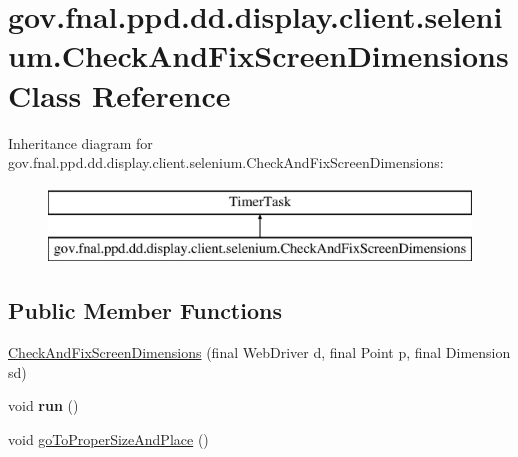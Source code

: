 \hypertarget{classgov_1_1fnal_1_1ppd_1_1dd_1_1display_1_1client_1_1selenium_1_1CheckAndFixScreenDimensions}{\section{gov.\-fnal.\-ppd.\-dd.\-display.\-client.\-selenium.\-Check\-And\-Fix\-Screen\-Dimensions Class Reference}
\label{classgov_1_1fnal_1_1ppd_1_1dd_1_1display_1_1client_1_1selenium_1_1CheckAndFixScreenDimensions}
}
Inheritance diagram for gov.\-fnal.\-ppd.\-dd.\-display.\-client.\-selenium.\-Check\-And\-Fix\-Screen\-Dimensions\-:\begin{figure}[H]
\begin{center}
\leavevmode
\includegraphics[height=2.000000cm]{classgov_1_1fnal_1_1ppd_1_1dd_1_1display_1_1client_1_1selenium_1_1CheckAndFixScreenDimensions}
\end{center}
\end{figure}
\subsection*{Public Member Functions}
\begin{DoxyCompactItemize}
\item 
\hyperlink{classgov_1_1fnal_1_1ppd_1_1dd_1_1display_1_1client_1_1selenium_1_1CheckAndFixScreenDimensions_afbf18b435030ff5809a523161572d815}{Check\-And\-Fix\-Screen\-Dimensions} (final Web\-Driver d, final Point p, final Dimension sd)
\item 
\hypertarget{classgov_1_1fnal_1_1ppd_1_1dd_1_1display_1_1client_1_1selenium_1_1CheckAndFixScreenDimensions_a78a97c7a284cd33ea543d39aaa663ebc}{void {\bfseries run} ()}\label{classgov_1_1fnal_1_1ppd_1_1dd_1_1display_1_1client_1_1selenium_1_1CheckAndFixScreenDimensions_a78a97c7a284cd33ea543d39aaa663ebc}

\item 
void \hyperlink{classgov_1_1fnal_1_1ppd_1_1dd_1_1display_1_1client_1_1selenium_1_1CheckAndFixScreenDimensions_ae141a36b6c496443e18172b63c40af35}{go\-To\-Proper\-Size\-And\-Place} ()
\end{DoxyCompactItemize}


